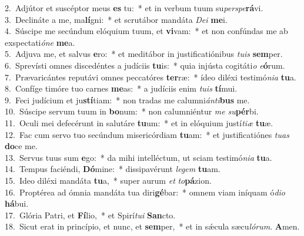 {2.~}Adjútor et suscéptor meus \textbf{es} tu:~* et in verbum tuum su\textit{per}\textit{spe}\textbf{rá}vi.\\
{3.~}Declináte a me, ma\textbf{lí}gni:~* et scrutábor mandáta \textit{De}\textit{i} \textbf{me}i.\\
{4.~}Súscipe me secúndum elóquium tuum, et \textbf{vi}vam:~* et non confúndas me ab exspectati\textit{ó}\textit{ne} \textbf{me}a.\\
{5.~}Adjuva me, et salvus \textbf{e}ro:~* et meditábor in justificatiónibus \textit{tu}\textit{is} \textbf{sem}per.\\
{6.~}Sprevísti omnes discedéntes a judíciis \textbf{tu}is:~* quia injústa cogitáti\textit{o} \textit{e}\textbf{ó}rum.\\
{7.~}Prævaricántes reputávi omnes peccatóres \textbf{ter}ræ:~* ídeo diléxi testimó\textit{ni}\textit{a} \textbf{tu}a.\\
{8.~}Confíge timóre tuo carnes \textbf{me}as:~* a judíciis enim \textit{tu}\textit{is} \textbf{tí}mui.\\
{9.~}Feci judícium et ju\textbf{stí}tiam:~* non tradas me calumni\textit{án}\textit{ti}\textbf{bus} me.\\
{10.~}Súscipe servum tuum in \textbf{bo}num:~* non calumniéntur \textit{me} \textit{su}\textbf{pér}bi.\\
{11.~}Oculi mei defecérunt in salutáre \textbf{tu}um:~* et in elóquium justí\textit{ti}\textit{æ} \textbf{tu}æ.\\
{12.~}Fac cum servo tuo secúndum misericórdiam \textbf{tu}am:~* et justificatiónes \textit{tu}\textit{as} \textbf{do}ce me.\\
{13.~}Servus tuus sum \textbf{e}go:~* da mihi intelléctum, ut sciam testimó\textit{ni}\textit{a} \textbf{tu}a.\\
{14.~}Tempus faciéndi, \textbf{Dó}mine:~* dissipavérunt \textit{le}\textit{gem} \textbf{tu}am.\\
{15.~}Ideo diléxi mandáta \textbf{tu}a,~* super aurum \textit{et} \textit{to}\textbf{pá}zion.\\
{16.~}Proptérea ad ómnia mandáta tua diri\textbf{gé}bar:~* omnem viam iníquam ó\textit{di}\textit{o} \textbf{há}bui.\\
{17.~}Glória Patri, et \textbf{Fí}lio,~* et Spirí\textit{tu}\textit{i} \textbf{San}cto.\\
{18.~}Sicut erat in princípio, et nunc, et \textbf{sem}per,~* et in sǽcula sæcu\textit{ló}\textit{rum}. \textbf{A}men.\\
